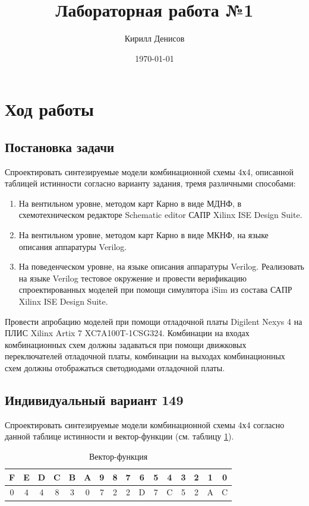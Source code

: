 \documentclass[a4paper,14pt]{extarticle}
\author{Кирилл Денисов}
\title{Лабораторная работа №1}
\date{\today}
\newcommand{\pathToCommonFolder}{/home/denilai/Documents/repos/latex/Common}
\begin{document}
	\thispagestyle{empty}
	
	\newpage
	\tableofcontents
	\newpage
\section{Ход работы}	
\subsection {Постановка задачи}
Спроектировать синтезируемые модели комбинационной схемы 4х4, описанной
таблицей истинности согласно варианту задания, тремя различными способами:
\begin{enumerate}
	\item На вентильном уровне, методом карт Карно в виде МДНФ, в схемотехническом
	редакторе Schematic editor САПР Xilinx ISE Design Suite.
	\item На вентильном уровне, методом карт Карно в виде МКНФ, на языке описания
	аппаратуры Verilog.
	\item На поведенческом уровне, на языке описания аппаратуры Verilog.
	Реализовать на языке Verilog тестовое окружение и провести верификацию
	спроектированных моделей при помощи симулятора iSim из состава
	САПР Xilinx ISE Design Suite.
\end{enumerate}

Провести апробацию моделей при помощи отладочной платы Digilent Nexys 4 на
ПЛИС Xilinx Artix 7 XC7A100T-1CSG324. Комбинации на входах комбинационных схем
должны задаваться при помощи движковых переключателей отладочной платы,
комбинации на выходах комбинационных схем должны отображаться светодиодами
отладочной платы.
\subsection {Индивидуальный вариант 149}
Спроектировать синтезируемые модели комбинационной схемы 4х4 согласно данной таблице истинности и вектор-функции (см. таблицу \ref{tab:func-vector}).

\begin{table}[htbp]
	\begin{center}
	\begin{tabular}{|c|c|c|c|c|c|c|c|c|c|c|c|c|c|c|c|}
		\hline
		F & E & D & C & B & A & 9 & 8 & 7 & 6 & 5 & 4 & 3 & 2 & 1 & 0 \\ \hline\hline
		0 & 4 & 4 & 8 & 3 & 0 & 7 & 2 & 2 & D & 7 & C & 5 & 2 & A & C \\ \hline
	\end{tabular}
	\caption{Вектор-функция}
	\label{tab:func-vector}
\end{center}
\end{table}
\end{document}

